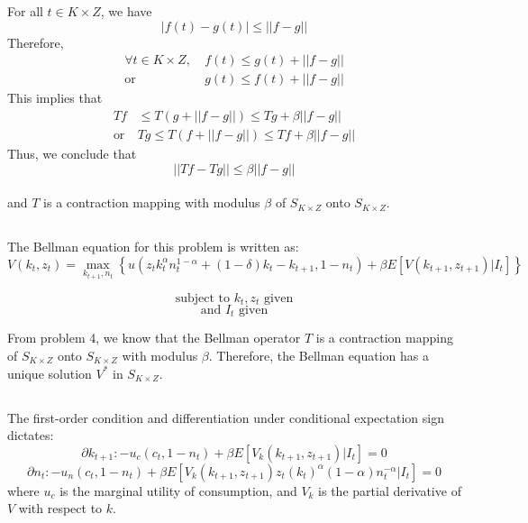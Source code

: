 \documentclass{article}
\begin{document}
For all $t \in K \times Z$, we have
\begin{equation}
    |f(t) - g(t)| \leq ||f - g||
\end{equation}
Therefore,
\begin{align*}
    \forall t \in K \times Z, \ &f(t) \leq g(t) + ||f - g|| \\
    \text{or} \ &g(t) \leq f(t) + ||f - g||
\end{align*}
This implies that
\begin{align}
    Tf &\leq T(g + ||f - g||) \leq Tg + \beta ||f - g|| \\
    \text{or} \ &Tg \leq T(f + ||f - g||) \leq Tf + \beta ||f - g||
\end{align}
Thus, we conclude that
\begin{equation}
    ||Tf - Tg|| \leq \beta ||f - g||
\end{equation}\\
and $T$ is a contraction mapping with modulus $\beta$ of $S_{K \times Z}$ onto $S_{K \times Z}$.


\subsection{}
The Bellman equation for this problem is written as:
\[ V(k_t, z_t) = \max_{k_{t+1}, n_t} \left\{ u\left(z_t k_t^\alpha n_t^{1-\alpha} + (1-\delta) k_t - k_{t+1}, 1 - n_t\right) + \beta E[V(k_{t+1}, z_{t+1}) | I_t] \right\} \]

\[\text{subject to } k_t, z_t \text{ given}\]
\[\text{and } I_t \text{ given} \]

From problem 4, we know that the Bellman operator $T$ is a contraction mapping of $S_{K \times Z}$ onto $S_{K \times Z}$ with modulus $\beta$. 
Therefore, the Bellman equation has a unique solution $V^*$ in $S_{K \times Z}$. 

\subsection{}

The first-order condition and differentiation under conditional expectation sign dictates:
\begin{equation}
    \partial{k_{t+1}}:  -u_c\left(c_t, 1 - n_t\right) + \beta E[V_k(k_{t+1}, z_{t+1}) | I_t] = 0
\end{equation}
\begin{equation}
    \partial{n_t}: -u_n\left(c_t, 1 - n_t\right) + \beta E[V_k(k_{t+1}, z_{t+1}) z_t (k_t)^{\alpha}(1-\alpha)n_t^{-\alpha}| I_t] = 0
\end{equation}
where $u_c$ is the marginal utility of consumption, and $V_k$ is the partial derivative of $V$ with respect to $k$. \\
\end{document}
